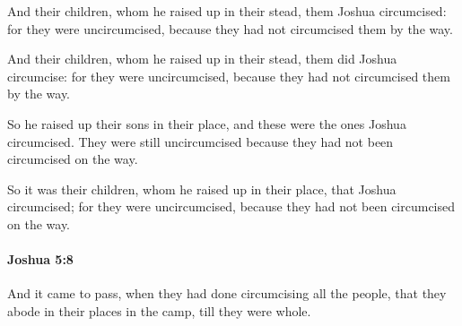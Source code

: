			And their children, whom he raised up in their stead, them Joshua circumcised: for they were uncircumcised, because they had not circumcised them by the way.

			\begin{versebox}
					\item[BHS] 
					\item[ASV] And their children, whom he raised up in their stead, them did Joshua circumcise: for they were uncircumcised, because they had not circumcised them by the way.
					\item[NIV] So he raised up their sons in their place, and these were the ones Joshua circumcised. They were still uncircumcised because they had not been circumcised on the way.
					\item[NRSV] So it was their children, whom he raised up in their place, that Joshua circumcised; for they were uncircumcised, because they had not been circumcised on the way.
			\end{versebox}

		\paragraph{Joshua 5:8} %
			\label{JOSHUA-5-8}

			And it came to pass, when they had done circumcising all the people, that they abode in their places in the camp, till they were whole.

